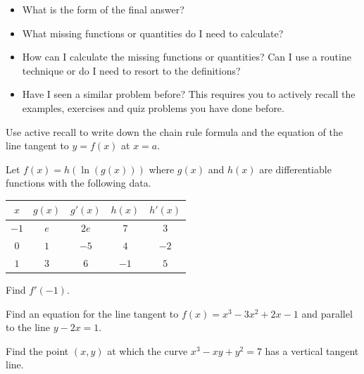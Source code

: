 \documentclass[../main.tex]{subfiles}
\begin{document}
\begin{itemize}
  \item What is the form of the final answer?
  \item What missing functions or quantities do I need to calculate?
  \item How can I calculate the missing functions or quantities? Can I use a routine technique or do I need to resort to the definitions?
  \item Have I seen a similar problem before? This requires you to actively recall the examples, exercises and quiz problems you have done before. 
\end{itemize}
\clearpage
 
Use active recall to write down the chain rule formula and the equation of the line tangent to \(y = f(x)\) at \(x = a\).

 
\begin{example}
  Let \(f(x) = h(\ln(g(x)))\) where \(g(x)\) and \(h(x)\) are differentiable functions with the following data.

  \begin{center}
    \begin{tabular}{c|c c c c}
      \(x\)  & \(g(x)\) & \(g'(x)\) & \(h(x)\) & \(h'(x)\) \\\midrule
      \(-1\) & \(e\)    & \(2e\)    & \(7\)    & \(3\)     \\
      \(0\)  & \(1\)    & \(-5\)    & \(4\)    & \(-2\)    \\
      \(1\)  & \(3\)    & \(6\)     & \(-1\)   & \(5\)
    \end{tabular}
  \end{center}

  Find \(f'(-1)\).

  \blanks*
\end{example}

\begin{exercise} \label{ex:cubic-tangent-parallel-to-line}
  Find an equation for the line tangent to \(f(x) = x^3 - 3x^2 + 2x - 1\) and parallel to the line \(y - 2x = 1\).
  
  \blanks*
\end{exercise}
\clearpage

\begin{exercise}
  Find the point \((x,y)\) at which the curve \(x^{3} - xy + y^{2} = 7\) has a vertical tangent line.
  
  \blanks*
\end{exercise}
\clearpage
\end{document}
